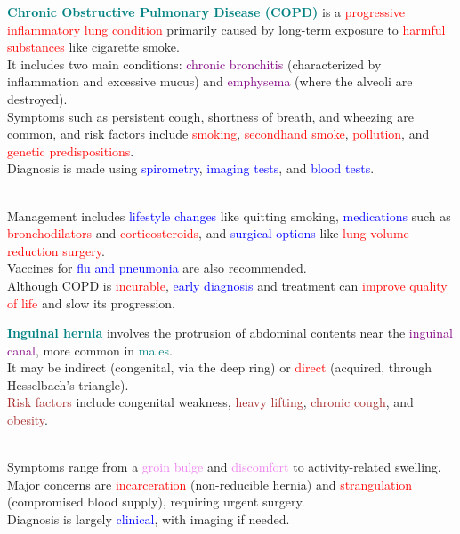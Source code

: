 \documentclass{article}
\begin{document}
\bigskip

\newpage

\textcolor{teal}{\Large \bf Chronic Obstructive Pulmonary Disease (COPD)} is a \textcolor{red}{progressive inflammatory lung condition} primarily caused by long-term exposure to \textcolor{red}{harmful substances} like cigarette smoke.\\
It includes two main conditions: \textcolor{purple}{chronic bronchitis} (characterized by \textcolor{dark red}{inflammation and excessive mucus}) and \textcolor{purple}{emphysema} (where the \textcolor{dark red}{alveoli are destroyed}).\\
Symptoms such as \textcolor{dark red}{persistent cough, shortness of breath, and wheezing} are common, and risk factors include \textcolor{red}{smoking}, \textcolor{red}{secondhand smoke}, \textcolor{red}{pollution}, and \textcolor{red}{genetic predispositions}.\\
Diagnosis is made using \textcolor{blue}{spirometry}, \textcolor{blue}{imaging tests}, and \textcolor{blue}{blood tests}.

\\
Management includes \textcolor{blue}{lifestyle changes} like quitting smoking, \textcolor{blue}{medications} such as \textcolor{red}{bronchodilators} and \textcolor{red}{corticosteroids}, and \textcolor{blue}{surgical options} like \textcolor{red}{lung volume reduction surgery}.\\
Vaccines for \textcolor{blue}{flu and pneumonia} are also recommended.\\
Although COPD is \textcolor{red}{incurable}, \textcolor{blue}{early diagnosis} and treatment can \textcolor{red}{improve quality of life} and slow its progression.

\bigskip

\textcolor{teal}{\Large \bf Inguinal hernia} involves the protrusion of abdominal contents near the \textcolor{purple}{inguinal canal}, more common in \textcolor{teal}{males}.\\
It may be \textcolor{dark red}{indirect} (congenital, via the deep ring) or \textcolor{red}{direct} (acquired, through Hesselbach’s triangle).\\
\textcolor{brown}{Risk factors} include congenital weakness, \textcolor{brown}{heavy lifting}, \textcolor{brown}{chronic cough}, and \textcolor{brown}{obesity}.

\\
Symptoms range from a \textcolor{violet}{groin bulge} and \textcolor{violet}{discomfort} to activity-related swelling.\\
Major concerns are \textcolor{red}{incarceration} (non-reducible hernia) and \textcolor{red}{strangulation} (compromised blood supply), requiring urgent surgery.\\
Diagnosis is largely \textcolor{blue}{clinical}, with imaging if needed.
\end{document}
